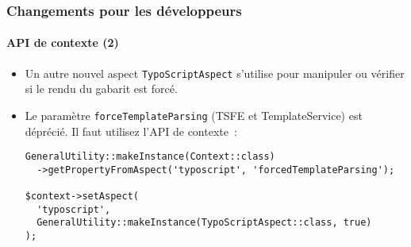 
\begin{frame}[fragile]
	\frametitle{Changements pour les développeurs}
	\framesubtitle{API de contexte (2)}

	\lstset{basicstyle=\tiny\ttfamily}

	\begin{itemize}

		\item Un autre nouvel aspect \texttt{TypoScriptAspect} s'utilise pour manipuler ou vérifier si
			le rendu du gabarit est forcé.

		\item Le paramètre \texttt{forceTemplateParsing} (TSFE et TemplateService) est déprécié.
			Il faut utilisez l'API de contexte~:

\begin{lstlisting}
GeneralUtility::makeInstance(Context::class)
  ->getPropertyFromAspect('typoscript', 'forcedTemplateParsing');

$context->setAspect(
  'typoscript',
  GeneralUtility::makeInstance(TypoScriptAspect::class, true)
);
\end{lstlisting}

	\end{itemize}

\end{frame}


